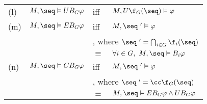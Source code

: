 \begin{tabular}{llll}
	(l) & $M,\seq \vDash UB_G \varphi$  & iff    & $ M,U\f_G(\seq) \vDash \varphi$\\[1mm]
	(m) & $M,\seq \vDash EB_G \varphi$  & iff    & $ M,\seq~'\vDash \varphi$\\
	    &                               & \multicolumn{2}{l}{, where $\seq~'=\bigcap_{i \in G} \f_i(\seq)$ } \\
	    &                               & $\equiv$ & $\forall i \in G,\ M,\seq \vDash B_i \varphi$ \\ [1mm]
	(n) & $M,\seq \vDash CB_G \varphi$  & iff    & $ M,\seq~'\vDash \varphi$\\
	    &                               & \multicolumn{2}{l}{, where $\seq~'=\cc\f_G(\seq)$ } \\
	    &                               & $\equiv$ & $M,\seq \vDash EB_G \varphi \land UB_G \varphi $ \\ [1mm]	    
\end{tabular}
\vspace{2mm}


	

	










